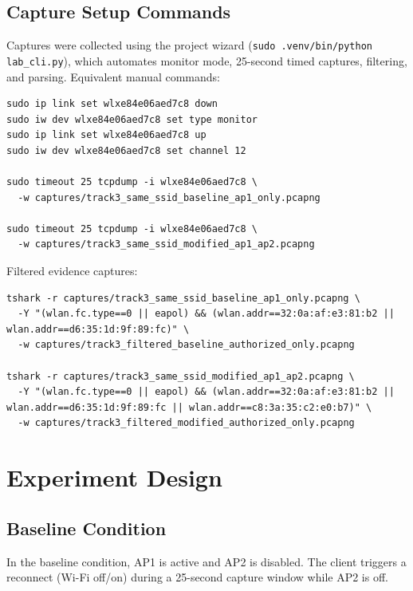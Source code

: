 \documentclass[12pt,a4paper]{article}
\begin{document}
\subsection{Capture Setup Commands}

Captures were collected using the project wizard (\texttt{sudo .venv/bin/python lab\_cli.py}), which automates monitor mode, 25-second timed captures, filtering, and parsing. Equivalent manual commands:

\begin{lstlisting}
sudo ip link set wlxe84e06aed7c8 down
sudo iw dev wlxe84e06aed7c8 set type monitor
sudo ip link set wlxe84e06aed7c8 up
sudo iw dev wlxe84e06aed7c8 set channel 12

sudo timeout 25 tcpdump -i wlxe84e06aed7c8 \
  -w captures/track3_same_ssid_baseline_ap1_only.pcapng

sudo timeout 25 tcpdump -i wlxe84e06aed7c8 \
  -w captures/track3_same_ssid_modified_ap1_ap2.pcapng
\end{lstlisting}

Filtered evidence captures:

\begin{lstlisting}
tshark -r captures/track3_same_ssid_baseline_ap1_only.pcapng \
  -Y "(wlan.fc.type==0 || eapol) && (wlan.addr==32:0a:af:e3:81:b2 || wlan.addr==d6:35:1d:9f:89:fc)" \
  -w captures/track3_filtered_baseline_authorized_only.pcapng

tshark -r captures/track3_same_ssid_modified_ap1_ap2.pcapng \
  -Y "(wlan.fc.type==0 || eapol) && (wlan.addr==32:0a:af:e3:81:b2 || wlan.addr==d6:35:1d:9f:89:fc || wlan.addr==c8:3a:35:c2:e0:b7)" \
  -w captures/track3_filtered_modified_authorized_only.pcapng
\end{lstlisting}

\section{Experiment Design}

\subsection{Baseline Condition}

In the baseline condition, AP1 is active and AP2 is disabled. The client triggers a reconnect (Wi-Fi off/on) during a 25-second capture window while AP2 is off.
\end{document}
